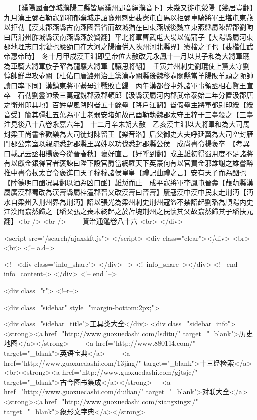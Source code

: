 　　【濮陽國唐鄄城濮陽二縣皆屬濮州鄄音絹濮音卜】未幾又徙屯滎陽【幾居豈翻】　九月漢王彌石勒寇鄴和郁棄城走詔豫州刺史裴憲屯白馬以拒彌車騎將軍王堪屯東燕以拒勒【漢東郡燕縣古南燕國晉省而故城猶在曰東燕城後魏立東燕縣屬陳留郡劉昫曰唐滑州胙城縣漢南燕縣燕於賢翻】平北將軍曹武屯大陽以備蒲子【大陽縣屬河東郡地理志曰北虢也應劭曰在大河之陽唐倂入陜州河北縣界】憲楷之子也【裴楷仕武帝惠帝時】　冬十月甲戍漢王淵即皇帝位大赦改元永鳳十一月以其子和為大將軍聰為車騎大將軍族子曜為龍驤大將軍【驤思將翻】　壬寅并州刺史劉琨使上黨太守劉惇帥鮮卑攻壺關【杜佑曰唐潞州治上黨漢壺關縣後魏移壺關縣當羊腸阪羊頭之阨帥讀曰率下同】漢鎮東將軍綦母達戰敗亡歸　丙午漢都督中外諸軍事領丞相右賢王宣卒　石勒劉靈帥衆三萬寇魏郡汲郡頓邱【汲縣漢屬河内郡武帝泰始二年分置汲郡唐之衛州即其地】百姓望風降附者五十餘壘【降戶江翻】皆假壘主將軍都尉印綬【綬音受】簡其彊壯五萬為軍士老弱安堵如故己酉勒執魏郡太守王粹于三臺殺之【三臺注見後八十八卷永嘉六年】　十二月辛未朔大赦　乙亥漢主淵以大將軍和為大司馬封梁王尚書令歡樂為大司徒封陳留王【樂音洛】后父御史大夫呼延翼為大司空封雁門郡公宗室以親疏悉封郡縣王異姓以功伐悉封郡縣公侯　成尚書令楊褒卒　【考異曰載記云丞相楊褒今從晉春秋】褒好直言【好呼到翻】成主雄初得蜀用度不足諸將有以獻金銀得官者褒諫曰陛下設官爵當網羅天下英豪何有以官買金邪雄謝之雄嘗醉推中書令杖太官令褒進曰天子穆穆諸侯皇皇【禮記曲禮之言】安有天子而為酗也【陸德明曰酗况具翻以酒為凶曰酗】雄慙而止　成平寇將軍李鳳屯晉壽【葭萌縣漢屬廣漢郡蜀改為漢壽縣屬梓潼郡晉又改漢壽曰晉壽】屢寇漢中漢中民東走荆沔【沔水自梁州入荆州界為荆沔】詔以張光為梁州刺史荆州寇盜不禁詔起劉璠為順陽内史江漢閒翕然歸之【璠父弘之喪未終起之於苫塊荆州之民懷其父故翕然歸其子璠扶元翻】<br />
<br />
　　資治通鑑卷八十六  <br>
   </div> 

<script src="/search/ajaxskft.js"> </script>
 <div class="clear"></div>
<br>
<br>
 <!-- a.d-->

 <!--
<div class="info_share">
</div> 
-->
 <!--info_share--></div>   <!-- end info_content-->
  </div> <!-- end l-->

<div class="r">   <!--r-->



<div class="sidebar"  style="margin-bottom:2px;">

 
<div class="sidebar_title">工具类大全</div>
<div class="sidebar_info">
<strong><a href="http://www.guoxuedashi.com/lsditu/" target="_blank">历史地图</a></strong>　　
<a href="http://www.880114.com/" target="_blank">英语宝典</a>　　
<a href="http://www.guoxuedashi.com/13jing/" target="_blank">十三经检索</a>　
<br><strong><a href="http://www.guoxuedashi.com/gjtsjc/" target="_blank">古今图书集成</a></strong>　
<a href="http://www.guoxuedashi.com/duilian/" target="_blank">对联大全</a>　<strong><a href="http://www.guoxuedashi.com/xiangxingzi/" target="_blank">象形文字典</a></strong>　


